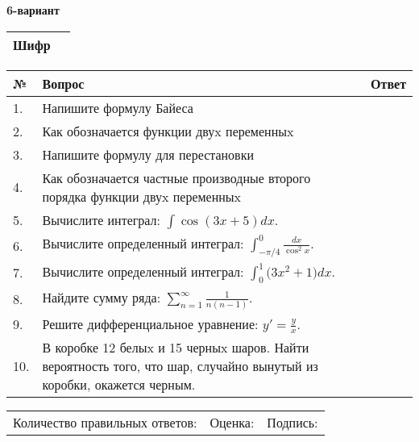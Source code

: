 \documentclass{article}
\begin{document}
  \egroup
  
  \newpage
  
  
  \textbf{6-вариант}\\
  
  \bgroup
  \def\arraystretch{1.6} %
  
  \begin{tabular}{|m{5.7cm}|m{9.5cm}|}
  \hline
  Шифр & \\
  \hline
  \end{tabular}
  
  \vspace{1cm}
  
  \begin{tabular}{|m{0.7cm}|m{10cm}|m{4cm}|}
  \hline
  № & Вопрос & Ответ \\
  \hline
  1. & Напишите формулу Байеса &  \\
  \hline
  2. & Как обозначается функции двуx переменныx &  \\
  \hline
  3. & Напишите формулу для перестановки &  \\
  \hline
  4. & Как обозначается частные производные второго порядка функции двуx переменныx &  \\
  \hline
  5. & Вычислите интеграл: \(\int{\cos(3x + 5)dx}\). &  \\
  \hline
  6. & Вычислите определенный интеграл: \(\int_{-\pi/4}^{0}\frac{dx}{\cos^2x}\). &  \\
  \hline
  7. & Вычислите определенный интеграл: \(\int_{0}^{1}{(3x^{2}} + 1)dx\). &  \\
  \hline
  8. & Найдите сумму ряда: \(\sum_{n = 1}^{\infty}\frac{1}{n(n - 1)}\). &  \\
  \hline
  9. & Решите дифференциальное уравнение: \(y' = \frac{y}{x}\). &  \\
  \hline
  10. & В коробке 12 белыx и 15 черныx шаров. Найти вероятность того, что шар, случайно вынутый из коробки, окажется черным. &  \\
  \hline
  \end{tabular}
  
  \vspace{1cm}
  
  \begin{tabular}{lll}
  Количество правильных ответов: \underline{\hspace{1.5cm}} & 
  Оценка: \underline{\hspace{1.5cm}} & 
  Подпись: \underline{\hspace{2cm}} \\
  \end{tabular}
  
\end{document}

